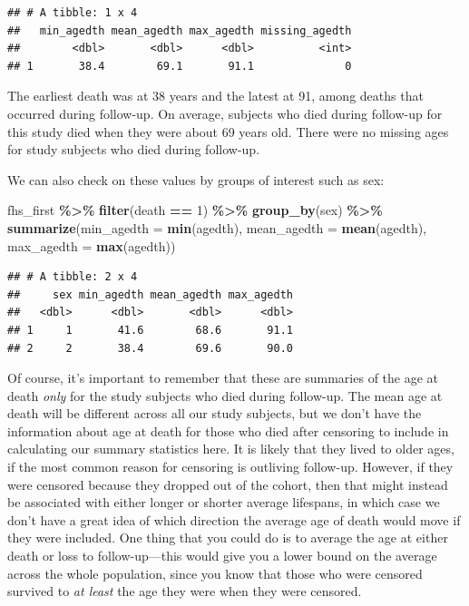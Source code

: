 \documentclass[
]{book}
\newenvironment{Shaded}{\begin{snugshade}}{\end{snugshade}}
\newcommand{\AttributeTok}[1]{\textcolor[rgb]{0.13,0.29,0.53}{#1}}
\newcommand{\DecValTok}[1]{\textcolor[rgb]{0.00,0.00,0.81}{#1}}
\newcommand{\FunctionTok}[1]{\textcolor[rgb]{0.13,0.29,0.53}{\textbf{#1}}}
\newcommand{\NormalTok}[1]{#1}
\newcommand{\SpecialCharTok}[1]{\textcolor[rgb]{0.81,0.36,0.00}{\textbf{#1}}}
\begin{document}
\begin{verbatim}
## # A tibble: 1 x 4
##   min_agedth mean_agedth max_agedth missing_agedth
##        <dbl>       <dbl>      <dbl>          <int>
## 1       38.4        69.1       91.1              0
\end{verbatim}

The earliest death was at 38 years and the latest at 91, among deaths that occurred during follow-up. On average, subjects who died during follow-up for this study died when they were about 69 years old. There were no missing ages for study subjects who died during follow-up.

We can also check on these values by groups of interest such as sex:

\begin{Shaded}
\begin{Highlighting}[]
\NormalTok{fhs\_first }\SpecialCharTok{\%\textgreater{}\%}
  \FunctionTok{filter}\NormalTok{(death }\SpecialCharTok{==} \DecValTok{1}\NormalTok{) }\SpecialCharTok{\%\textgreater{}\%} 
  \FunctionTok{group\_by}\NormalTok{(sex) }\SpecialCharTok{\%\textgreater{}\%}
  \FunctionTok{summarize}\NormalTok{(}\AttributeTok{min\_agedth =} \FunctionTok{min}\NormalTok{(agedth),}
            \AttributeTok{mean\_agedth =} \FunctionTok{mean}\NormalTok{(agedth),}
            \AttributeTok{max\_agedth =} \FunctionTok{max}\NormalTok{(agedth))}
\end{Highlighting}
\end{Shaded}

\begin{verbatim}
## # A tibble: 2 x 4
##     sex min_agedth mean_agedth max_agedth
##   <dbl>      <dbl>       <dbl>      <dbl>
## 1     1       41.6        68.6       91.1
## 2     2       38.4        69.6       90.0
\end{verbatim}

Of course, it's important to remember that these are summaries of the age at death \emph{only} for the study subjects who died during follow-up. The mean age at death will be different across all our study subjects, but we don't have the information about age at death for those who died after censoring to include in calculating our summary statistics here. It is likely that they lived to older ages, if the most common reason for censoring is outliving follow-up. However, if they were censored because they dropped out of the cohort, then that might instead be associated with either longer or shorter average lifespans, in which case we don't have a great idea of which direction the average age of death would move if they were included. One thing that you could do is to average the age at either death or loss to follow-up---this would give you a lower bound on the average across the whole population, since you know that those who were censored survived to \emph{at least} the age they were when they were censored.
\end{document}

